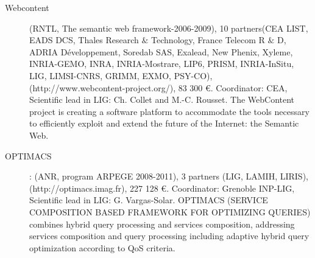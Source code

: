 
\begin{description}

\item[Webcontent] (RNTL, The semantic web framework-2006-2009), 10 partners(CEA LIST, EADS DCS, Thales Research  $\&$ Technology, France Telecom R  $\&$ D, ADRIA D{\'e}veloppement, Soredab SAS, Exalead, New Phenix, Xyleme, INRIA-GEMO, INRA, INRIA-Mostrare, LIP6, PRISM, INRIA-InSitu, LIG, LIMSI-CNRS, GRIMM, EXMO, PSY-CO), \\
(http://www.webcontent-project.org/), 83 300 \euro. Coordinator: CEA, Scientific lead in LIG: Ch. Collet and M.-C. Rousset. 
The WebContent project is creating a software platform to accommodate the tools necessary to efficiently exploit and extend the future of the Internet: the Semantic Web. 

\item[OPTIMACS]: (ANR, program ARPEGE 2008-2011), 3 partners (LIG, LAMIH, LIRIS),  \\
(http://optimacs.imag.fr), 227 128 \euro. Coordinator: Grenoble INP-LIG, Scientific lead in LIG: G. Vargas-Solar. OPTIMACS (SERVICE COMPOSITION BASED FRAMEWORK FOR OPTIMIZING QUERIES) combines hybrid query processing and services composition, addressing services composition and query processing including adaptive hybrid query optimization according to QoS criteria. 


\end{description}

